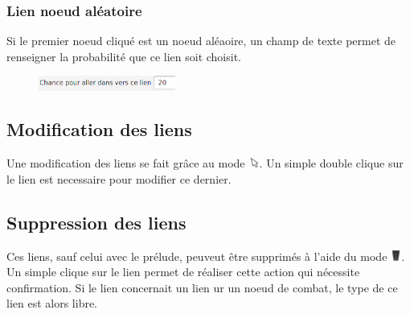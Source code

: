 			\subsubsection{Lien noeud aléatoire}
				\label{subsubsec:lienAléatoire}

				Si le premier noeud cliqué est un noeud aléaoire, un champ de texte permet de renseigner la probabilité que ce lien soit choisit.

				\begin{figure}[H]
					\centering\includegraphics[width=0.4\textwidth, keepaspectratio]{img/lienAleatoire.png}
				\end{figure}

		\subsection{Modification des liens}

			Une modification des liens se fait grâce au mode \includegraphics[height=10pt, keepaspectratio]{img/icons/select.png}. Un simple double clique sur le lien est necessaire pour modifier ce dernier.

		\subsection{Suppression des liens}

			Ces liens, sauf celui avec le prélude, peuveut être supprimés à l'aide du mode \includegraphics[height=10pt, keepaspectratio]{img/icons/delete.png}. Un simple clique sur le lien permet de réaliser cette action qui nécessite confirmation. Si le lien concernait un lien ur un noeud de combat, le type de ce lien est alors libre.
